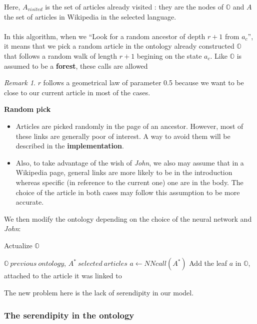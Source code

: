 \documentclass[11pt]{article}
\theoremstyle{plain}
\theoremstyle{definition}
\theoremstyle{remark}
\newtheorem*{rem}{Remark}
\begin{document}
\newpage


Here, $A_{visited}$ is the set of articles already visited : they are the nodes of $\mathbb{O}$ and $A$ the set of articles in Wikipedia in the selected language.\\\\
In this algorithm, when we ``Look for a random ancestor of depth $r+1$ from $a_c$'', it means that we pick a random article in the ontology already constructed $\mathbb{O}$ that follows a random walk of length $r+1$ begining on the state $a_c$. Like $\mathbb{O}$ is assumed to be a \textbf{forest}, these calls are allowed 
\begin{rem}
  $r$ follows a geometrical law of parameter 0.5 because we want to be close to our current article in most of the cases.\\
\end{rem}
\textbf{Random pick}
\begin{itemize}
\item Articles are picked randomly in the page of an ancestor. However, most of these links are generally poor of interest. A way to avoid them will be described in the \textbf{implementation}.
\item Also, to take advantage of the wish of \textit{John}, we also may assume that in a Wikipedia page, general links are more likely to be in the introduction whereas specific (in reference to the current one) one are in the body. The choice of the article in both cases may follow this assumption to be more accurate.  
\end{itemize}

We then modify the ontology depending on the choice of the neural network and \textit{John}: 

\begin{algorithm}
	\caption{Actualize $\mathbb{O}$}
	\begin{algorithmic}
		\REQUIRE $\mathbb{O} \: previous \: ontology$, $A^* \: selected \: articles$
		\STATE $a\leftarrow NNcall(A^*)$
		\STATE Add the leaf $a$ in $\mathbb{O}$, attached to the article it was linked to
	\end{algorithmic}
\end{algorithm}
		
The new problem here is the lack of serendipity in our model. 

\subsubsection{The serendipity in the ontology}
\end{document}
